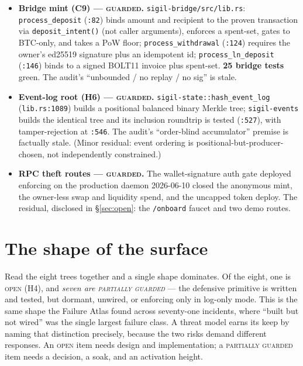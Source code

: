 \documentclass[10pt,a4paper]{article}
\newcommand{\measured}[1]{\textcolor{sigilcyan}{\textbf{#1}}}
\newcommand{\mgGuard}{{\scriptsize\textcolor{sigilcyan}{\textsc{guarded}}}}
\newcommand{\mgPartial}{{\scriptsize\textcolor{sigilviolet}{\textsc{partially guarded}}}}
\newcommand{\mgOpen}{{\scriptsize\textcolor{sigilamber}{\textsc{open}}}}
\begin{document}
\begin{itemize}[leftmargin=1.4em,itemsep=2pt]
\item \textbf{Bridge mint (C9) — \mgGuard{}.} \texttt{sigil-bridge/src/lib.rs}:
\texttt{process\_deposit} (\texttt{:82}) binds amount and recipient to the proven
transaction via \texttt{deposit\_intent()} (not caller arguments), enforces a spent-set,
gates to BTC-only, and takes a PoW floor; \texttt{process\_withdrawal} (\texttt{:124})
requires the owner's ed25519 signature plus an idempotent id; \texttt{process\_ln\_deposit}
(\texttt{:146}) binds to a signed BOLT11 invoice plus spent-set. \measured{25 bridge tests}
green. The audit's ``unbounded / no replay / no sig'' is stale.
\item \textbf{Event-log root (H6) — \mgGuard{}.} \texttt{sigil-state::hash\_event\_log}
(\texttt{lib.rs:1089}) builds a positional balanced binary Merkle tree;
\texttt{sigil-events} builds the identical tree and its inclusion roundtrip is tested
(\texttt{:527}), with tamper-rejection at \texttt{:546}. The audit's ``order-blind
accumulator'' premise is factually stale. (Minor residual: event ordering is
positional-but-producer-chosen, not independently constrained.)
\item \textbf{RPC theft routes — \mgGuard{}.} The wallet-signature auth gate deployed
enforcing on the production daemon 2026-06-10 closed the anonymous mint, the owner-less
swap and liquidity spend, and the uncapped token deploy. The residual, disclosed in
\S\ref{sec:open}: the \texttt{/onboard} faucet and two demo routes.
\end{itemize}

\section{The shape of the surface}
\label{sec:shape}

Read the eight trees together and a single shape dominates. Of the eight, one is
\mgOpen{} (H4), and \emph{seven are \mgPartial{}} — the defensive primitive is written and
tested, but dormant, unwired, or enforcing only in log-only mode. This is the same shape the
Failure Atlas found across seventy-one incidents, where ``built but not wired'' was the
single largest failure class. A threat model earns its keep by naming that distinction
precisely, because the two risks demand different responses. An \mgOpen{} item needs design
and implementation; a \mgPartial{} item needs a decision, a soak, and an activation height.
\end{document}
